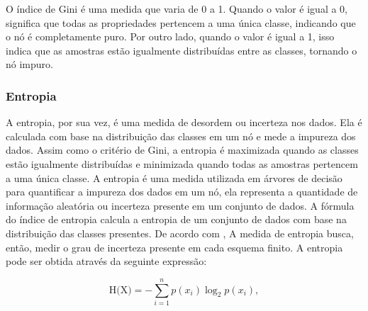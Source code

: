 \documentclass[12pt,oneside,a4paper,chapter=TITLE,
			   english,brazil]{abntex2}
\begin{document}
O índice de Gini é uma medida que varia de 0 a 1. Quando o valor é igual a 0, significa que todas as propriedades pertencem a uma única classe, indicando que o nó é completamente puro. Por outro lado, quando o valor é igual a 1, isso indica que as amostras estão igualmente distribuídas entre as classes, tornando o nó impuro.


\subsubsection{Entropia}

A entropia, por sua vez, é uma medida de desordem ou incerteza nos dados. Ela é calculada com base na distribuição das classes em um nó e mede a impureza dos dados. Assim como o critério de Gini, a entropia é maximizada quando as classes estão igualmente distribuídas e minimizada quando todas as amostras pertencem a uma única classe. A entropia é uma medida utilizada em árvores de decisão para quantificar a impureza dos dados em um nó,  ela representa a quantidade de informação aleatória ou incerteza presente em um conjunto de dados. A fórmula do índice de entropia calcula a entropia de um conjunto de dados com base na distribuição das classes presentes.  De acordo com   , A medida de entropia busca, então, medir o grau de incerteza presente em cada esquema finito. A entropia pode ser obtida através da seguinte expressão: 


\begin{equation}
    \text{H(X)} = -\sum_{i=1}^{n} p(x_i) \log_{2} p(x_i),
\end{equation}



\end{document}
